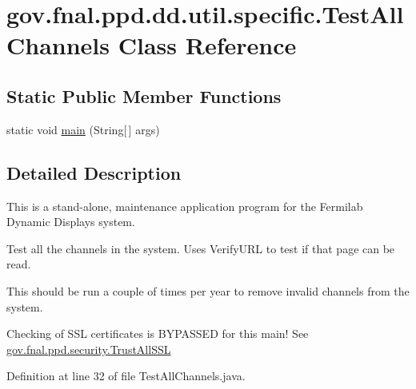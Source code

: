 \hypertarget{classgov_1_1fnal_1_1ppd_1_1dd_1_1util_1_1specific_1_1TestAllChannels}{\section{gov.\-fnal.\-ppd.\-dd.\-util.\-specific.\-Test\-All\-Channels Class Reference}
\label{classgov_1_1fnal_1_1ppd_1_1dd_1_1util_1_1specific_1_1TestAllChannels}
}
\subsection*{Static Public Member Functions}
\begin{DoxyCompactItemize}
\item 
static void \hyperlink{classgov_1_1fnal_1_1ppd_1_1dd_1_1util_1_1specific_1_1TestAllChannels_a425fb3591c64046af21e8530efcb40dd}{main} (String\mbox{[}$\,$\mbox{]} args)
\end{DoxyCompactItemize}


\subsection{Detailed Description}
This is a stand-\/alone, maintenance application program for the Fermilab Dynamic Displays system. 

Test all the channels in the system. Uses Verify\-U\-R\-L to test if that page can be read. 

This should be run a couple of times per year to remove invalid channels from the system. 

Checking of S\-S\-L certificates is B\-Y\-P\-A\-S\-S\-E\-D for this main! See \hyperlink{classgov_1_1fnal_1_1ppd_1_1security_1_1TrustAllSSL}{gov.\-fnal.\-ppd.\-security.\-Trust\-All\-S\-S\-L} 

Definition at line 32 of file Test\-All\-Channels.\-java.



